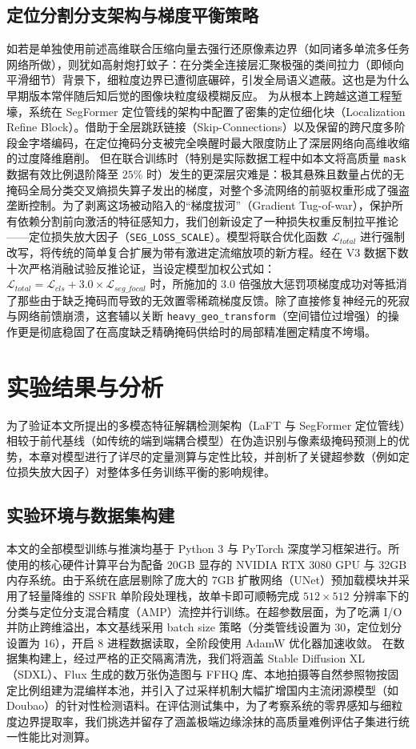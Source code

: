 \documentclass[UTF8, a4paper, 12pt]{ctexrep}
\begin{document}
\section{定位分割分支架构与梯度平衡策略}
如若是单独使用前述高维联合压缩向量去强行还原像素边界（如同诸多单流多任务网络所做），则犹如高射炮打蚊子：在分类全连接层汇聚极强的类间拉力（即倾向平滑细节）背景下，细粒度边界已遭彻底碾碎，引发全局语义遮蔽。这也是为什么早期版本常伴随后知后觉的图像块粒度级模糊反应。
为从根本上跨越这道工程堑壕，系统在 SegFormer 定位管线的架构中配置了密集的定位细化块（Localization Refine Block）。借助于全层跳跃链接（Skip-Connections）以及保留的跨尺度多阶段金字塔编码，在定位掩码分支被完全唤醒时最大限度防止了深层网络向高维收缩的过度降维磨削。
但在联合训练时（特别是实际数据工程中如本文将高质量 \texttt{mask} 数据有效比例退阶降至 $25\%$ 时）发生的更深层灾难是：极其悬殊且数量占优的无掩码全局分类交叉熵损失算子发出的梯度，对整个多流网络的前驱权重形成了强盗垄断控制。为了剥离这场被动陷入的“梯度拔河”（Gradient Tug-of-war），保护所有依赖分割前向激活的特征感知力，我们创新设定了一种损失权重反制拉平推论——定位损失放大因子（\texttt{SEG\_LOSS\_SCALE}）。模型将联合优化函数 $\mathcal{L}_{total}$ 进行强制改写，将传统的简单复合扩展为带有激进定流缩放项的新方程。经在 V3 数据下数十次严格消融试验反推论证，当设定模型加权公式如：$\mathcal{L}_{total} = \mathcal{L}_{cls} + 3.0 \times \mathcal{L}_{seg\_focal}$ 时，所施加的 $3.0$ 倍强放大惩罚项梯度成功对等抵消了那些由于缺乏掩码而导致的无效置零稀疏梯度反馈。除了直接修复神经元的死寂与网络前馈崩溃，这套辅以关断 \texttt{heavy\_geo\_transform}（空间错位过增强）的操作更是彻底稳固了在高度缺乏精确掩码供给时的局部精准圈定精度不垮塌。




\chapter{实验结果与分析}
为了验证本文所提出的多模态特征解耦检测架构（LaFT 与 SegFormer 定位管线）相较于前代基线（如传统的端到端耦合模型）在伪造识别与像素级掩码预测上的优势，本章对模型进行了详尽的定量测算与定性比较，并剖析了关键超参数（例如定位损失放大因子）对整体多任务训练平衡的影响规律。

\section{实验环境与数据集构建}
本文的全部模型训练与推演均基于 Python 3 与 PyTorch 深度学习框架进行。所使用的核心硬件计算平台为配备 20GB 显存的 NVIDIA RTX 3080 GPU 与 32GB 内存系统。由于系统在底层剔除了庞大的 $7\text{GB}$ 扩散网络（UNet）预加载模块并采用了轻量降维的 SSFR 单阶段处理栈，故单卡即可顺畅完成 $512 \times 512$ 分辨率下的分类与定位分支混合精度（AMP）流控并行训练。在超参数层面，为了吃满 I/O 并防止跨维溢出，本文基线采用 batch size 策略（分类管线设置为 30，定位划分设置为 16），开启 $8$ 进程数据读取，全阶段使用 AdamW 优化器加速收敛。
在数据集构建上，经过严格的正交隔离清洗，我们将涵盖 Stable Diffusion XL（SDXL）、Flux 生成的数万张伪造图与 FFHQ 库、本地拍摄等自然参照物按固定比例组建为混编样本池，并引入了过采样机制大幅扩增国内主流闭源模型（如 Doubao）的针对性检测语料。在评估测试集中，为了考察系统的零界感知与细粒度边界提取率，我们挑选并留存了涵盖极端边缘涂抹的高质量难例评估子集进行统一性能比对测算。
\end{document}
